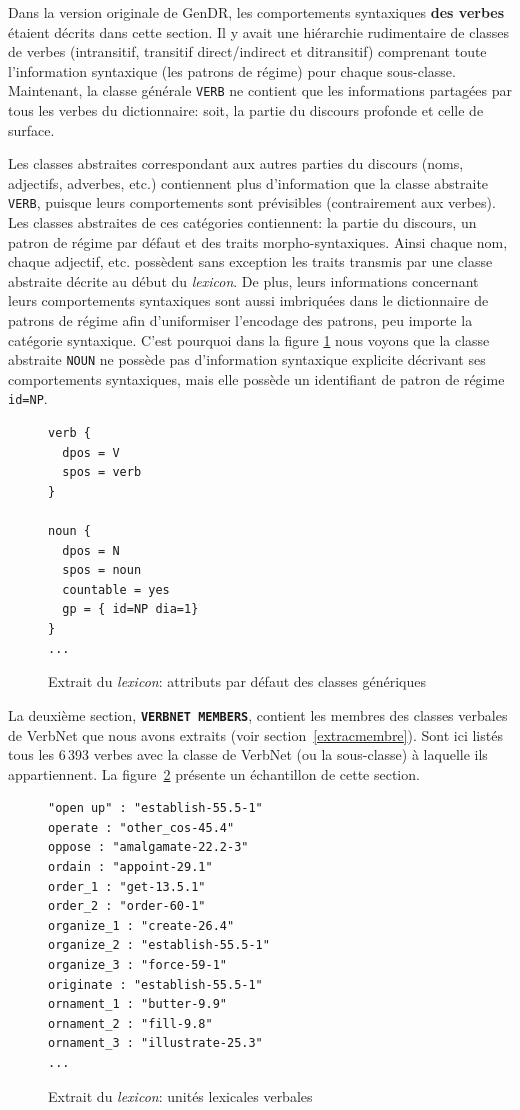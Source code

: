 Dans la version originale de GenDR, les comportements syntaxiques \textbf{des verbes} étaient décrits dans cette section. Il y avait une hiérarchie rudimentaire de classes de verbes (intransitif, transitif direct/indirect et ditransitif) comprenant toute l'information syntaxique (les patrons de régime) pour chaque sous-classe. Maintenant, la classe générale \texttt{VERB} ne contient que les informations partagées par tous les verbes du dictionnaire: soit, la partie du discours profonde et celle de surface. 

Les classes abstraites correspondant aux autres parties du discours (noms, adjectifs, adverbes, etc.) contiennent plus d'information que la classe abstraite \texttt{VERB}, puisque leurs comportements sont prévisibles (contrairement aux verbes). Les classes abstraites de ces catégories contiennent: la partie du discours, un patron de régime par défaut et des traits morpho-syntaxiques. Ainsi chaque nom, chaque adjectif, etc. possèdent sans exception les traits transmis par une classe abstraite décrite au début du \emph{lexicon}. De plus, leurs informations concernant leurs comportements syntaxiques sont aussi imbriquées dans le dictionnaire de patrons de régime afin d'uniformiser l'encodage des patrons, peu importe la catégorie syntaxique. C'est pourquoi dans la figure \ref{classedef} nous voyons que la classe abstraite \texttt{NOUN} ne possède pas d'information syntaxique explicite décrivant ses comportements syntaxiques, mais elle possède un identifiant de patron de régime \texttt{id=NP}.

\begin{figure}[htb]
  \caption{Extrait du \emph{lexicon}: attributs par défaut des classes génériques}
	\label{classedef}
\begin{lstlisting}[language=mate]
verb {
  dpos = V
  spos = verb
}

noun {
  dpos = N
  spos = noun
  countable = yes
  gp = { id=NP dia=1}
}
...
\end{lstlisting}
\end{figure}

La deuxième section, \textbf{\texttt{VERBNET MEMBERS}}, contient les membres des classes verbales de VerbNet que nous avons extraits (voir section~\ref{extracmembre}). Sont ici listés tous les 6\,393 verbes avec la classe de VerbNet (ou la sous-classe) à laquelle ils appartiennent. La figure~\ref{fig:extraituniteslexicales} présente un échantillon de cette section.

\begin{figure}[htb]
  \caption{Extrait du \emph{lexicon}: unités lexicales verbales}
	\label{fig:extraituniteslexicales}
\begin{lstlisting}[language=mate]
"open up" : "establish-55.5-1"
operate : "other_cos-45.4"
oppose : "amalgamate-22.2-3"
ordain : "appoint-29.1"
order_1 : "get-13.5.1"
order_2 : "order-60-1"
organize_1 : "create-26.4"
organize_2 : "establish-55.5-1"
organize_3 : "force-59-1"
originate : "establish-55.5-1"
ornament_1 : "butter-9.9"
ornament_2 : "fill-9.8"
ornament_3 : "illustrate-25.3"
...
\end{lstlisting}
\end{figure}

